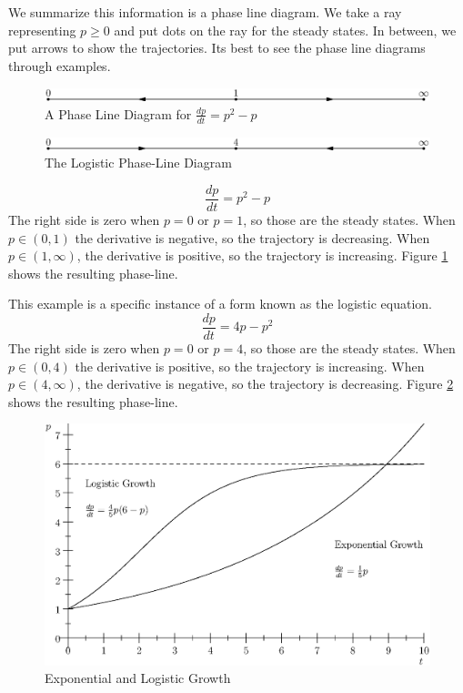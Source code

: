 \documentclass[fleqn,letterpaper]{report}
\begin{document}
We summarize this information is a phase line diagram. We
take a ray representing $p \geq 0$ and put dots on the ray for
the steady states. In between, we put arrows to show the
trajectories. Its best to see the phase line diagrams through
examples.

\begin{figure}[t]
\centering
\includegraphics[width=12cm]{figure02.eps}
\caption{A Phase Line Diagram for $\frac{dp}{dt} = p^2 - p$}
\label{figure-phase-line1}
\end{figure}

\begin{figure}[h!]
\centering
\includegraphics[width=12cm]{figure03.eps}
\caption{The Logistic Phase-Line Diagram}
\label{figure-logistic-phase-line}
\end{figure}

\begin{example}
\begin{example}
\begin{equation*}
\frac{dp}{dt} = p^2 - p
\end{equation*}
The right side is zero when $p=0$ or $p=1$, so those are the
steady states. When $p \in (0,1)$ the derivative is negative,
so the trajectory is decreasing. When $p \in (1, \infty)$, the
derivative is positive, so the trajectory is increasing.
Figure \ref{figure-phase-line1} shows the resulting
phase-line.
\end{example}

This example is a specific instance of a form known as the
logistic equation.
\begin{equation*}
\frac{dp}{dt} = 4p-p^2
\end{equation*}
The right side is zero when $p=0$ or $p=4$, so those are the
steady states. When $p \in (0,4)$ the derivative is positive,
so the trajectory is increasing. When $p \in (4, \infty)$, the
derivative is negative, so the trajectory is decreasing.
Figure \ref{figure-logistic-phase-line} shows the resulting
phase-line.
\end{example}

\begin{figure}[h!]
\centering
\includegraphics[width=12cm]{figure04.eps}
\caption{Exponential and Logistic Growth}
\label{figure-exponential-growth}
\end{figure}
\end{document}
